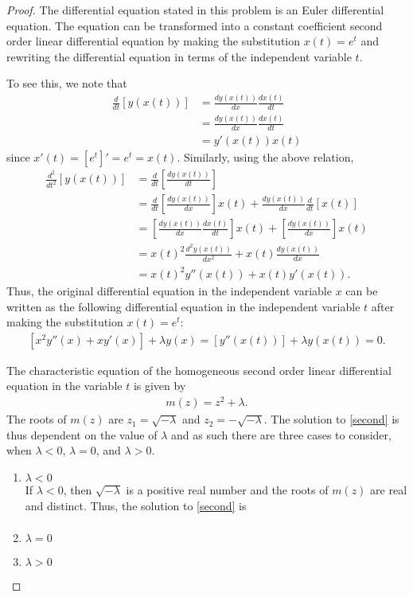 \documentclass[12pt]{article}
\theoremstyle{definition}
\newenvironment{case}{%
  \let\olditem\item%
  \renewcommand\item[1][]{\olditem \textbf{##1} \\}%
  \begin{enumerate}[label=\textbf{Case \arabic*:},itemindent=*,leftmargin=0em]}{\end{enumerate}%
}
\begin{document}
\begin{proof}
  The differential equation stated in this problem is an Euler differential
  equation. The equation can be transformed into a constant coefficient second
  order linear differential equation by making the substitution $x(t) = e^t$
  and rewriting the differential equation in terms of the independent variable
  $t$.

  To see this, we note that
  \begin{align*}
    \frac{d}{dt}\left[y(x(t))\right]
    &= \frac{dy(x(t))}{dx}\frac{dx(t)}{dt} \\
    &= \frac{dy(x(t))}{dx}\frac{dx(t)}{dt} \\
    &= y'(x(t)) x(t)
  \end{align*}
  since $x'(t) = [e^t]' = e^t = x(t)$. Similarly, using the above relation,
  \begin{align*}
    \frac{d^2}{dt^2}[y(x(t))]
    &= \frac{d}{dt}\left[\frac{dy(x(t))}{dt}\right] \\
    &= \frac{d}{dt}\left[\frac{dy(x(t))}{dx}\right] x(t) + \frac{dy(x(t))}{dx}\frac{d}{dt}\left[x(t)\right] \\
    &= \left[\frac{dy(x(t))}{dx}\frac{dx(t)}{dt}\right] x(t) + \left[\frac{dy(x(t))}{dx}\right] x(t) \\
    &= x(t)^2 \frac{d^2y(x(t))}{dx^2} + x(t)\frac{dy(x(t))}{dx} \\
    &= x(t)^2 y''(x(t)) + x(t)y'(x(t)).
  \end{align*}
  Thus, the original differential equation in the independent variable $x$ can
  be written as the following differential equation in the independent variable $t$
  after making the substitution $x(t) = e^t$:
  \begin{align}\label{second}
    \left[x^2y''(x) + xy'(x)\right] + \lambda y(x) = \left[y''(x(t))\right] + \lambda y(x(t)) = 0.
  \end{align}

  The characteristic equation of the homogeneous second order linear differential
  equation in the variable $t$ is given by
  \begin{align*}
    m(z) = z^2 + \lambda.
  \end{align*}
  The roots of $m(z)$ are $z_1=\sqrt{-\lambda}$ and $z_2=-\sqrt{-\lambda}$.
  The solution to \eqref{second} is thus dependent on the value of $\lambda$
  and as such there are three cases to consider, when $\lambda < 0$, $\lambda = 0$,
  and $\lambda > 0$.

  \begin{case}
    \item[$\lambda < 0$] If $\lambda < 0$, then $\sqrt{-\lambda}$ is a positive real number
      and the roots of $m(z)$ are real and distinct. Thus, the solution to \eqref{second}
      is
      \begin{align*}
      \end{align*}
    \item[$\lambda = 0$]
    \item[$\lambda > 0$]
  \end{case}

\end{proof}
\end{document}
